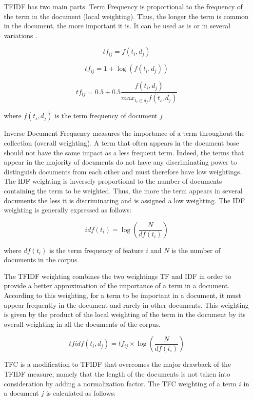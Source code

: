 TFIDF has two main parts. Term Frequency is proportional to the frequency of the term in the document (local weighting). Thus, the longer the term is common in the document, the more important it is. It can be used as is or in several variations \citep{singhal1997learning} \citep{sable2001using}.

$$t f _ { i j } = f \left( t _ { i } , d _ { j } \right)$$

$$t f _ { i j } = 1 + \log \left( f \left( t _ { i } , d _ { j } \right) \right)$$

$$ t f _ { i j } = 0.5 + 0.5 \frac { f \left( t _ { i } , d _ { j } \right) } { m a x _ { t _ { i } \in d _ { j } } f \left( t _ { i } , d _ { j } \right) }$$

where $f(t_{i},d_{j})$ is the term frequency of document $j$

Inverse Document Frequency measures the importance of a term throughout the collection (overall weighting). A term that often appears in the document base should not have the same impact as a less frequent term. Indeed, the terms that appear in the majority of documents do not have any discriminating power to distinguish documents from each other and must therefore have low weightings. The IDF weighting is inversely proportional to the number of documents containing the term to be weighted. Thus, the more the term appears in several documents the less it is discriminating and is assigned a low weighting. The IDF weighting is generally expressed as follows:

$$i d f \left( t _ { i } \right) = \log \left( \frac { N } { d f \left( t _ { i } \right) } \right)$$

where $df(t_{i})$ is the term frequency of feature $i$ and $N$ is the number of documents in the corpus.

The TFIDF weighting combines the two weightings TF and IDF in order to
provide a better approximation of the importance of a term in a
document. According to this weighting, for a term to be important in a
document, it must appear frequently in the document and rarely in other
documents. This weighting is given by the product of the local weighting
of the term in the document by its overall weighting in all the
documents of the corpus.

$$t f i d f \left( t _ { i } , d _ { j } \right) = t f _ { i j } \times \log \left( \frac { N } { d f \left( t _ { i } \right) } \right)$$


TFC is a modification to TFIDF that overcomes the major drawback of the
TFIDF measure, namely that the length of the documents is not taken into
consideration by adding a normalization factor. The TFC weighting of a
term $i$ in a document $j$ is calculated as follows:

